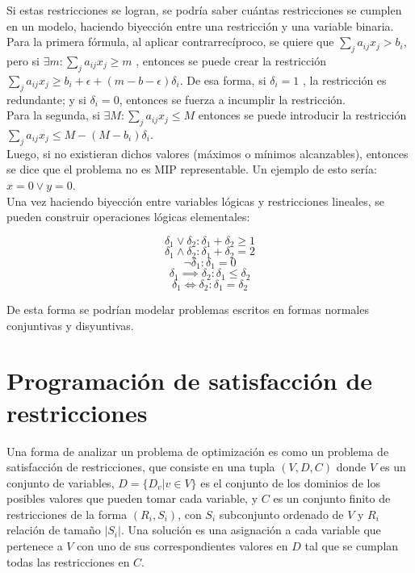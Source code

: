 \documentclass[12pt]{report}
\begin{document}
Si estas restricciones se logran, se podría saber cuántas restricciones se cumplen en un modelo, haciendo biyección entre una restricción y una variable binaria.\\

Para la primera fórmula, al aplicar contrarrecíproco, se quiere que $\sum_j a_{ij}x_j > b_i$, pero si $\exists m:\sum_j a_{ij}x_j\geq  m$ , entonces se puede crear la restricción $\sum_j a_{ij}x_j \geq  b_i+\epsilon+(m-b-\epsilon)\delta_i$. De esa forma, si $\delta_i=1$ , la restricción es redundante; y si $\delta_i=0$, entonces se fuerza a incumplir la restricción.\\

Para la segunda, si $\exists M:\sum_j a_{ij}x_j\leq  M$ entonces se puede introducir la restricción $\sum_j a_{ij}x_j \leq  M-(M-b_i)\delta_i$. \\

Luego, si no existieran dichos valores (máximos o mínimos alcanzables), entonces se dice que el problema no es MIP representable. Un ejemplo de esto sería: $x=0\lor  y=0$.\\

Una vez haciendo biyección entre variables lógicas y restricciones lineales, se pueden construir operaciones lógicas elementales:

$$\delta_1 \lor  \delta_2:\delta_1+\delta_2\geq 1$$
$$\delta_1 \land \delta_2:\delta_1+\delta_2=2$$
$$\neg\delta_1 :\delta_1=0$$
$$\delta_1 \implies  \delta_2:\delta_1\leq  \delta_2$$
$$\delta_1 \iff \delta_2:\delta_1=\delta_2$$

De esta forma se podrían modelar problemas escritos en formas normales conjuntivas y disyuntivas.

\section{Programación de satisfacción de restricciones}

Una forma de analizar un problema de optimización es como un problema de satisfacción de restricciones, que consiste en una tupla $(V,D,C)$ donde $V$ es un conjunto de variables, $D=\{D_v|v\in V\}$ es el conjunto de los dominios de los posibles valores que pueden tomar cada variable, y $C$ es un conjunto finito de restricciones de la forma $(R_i,S_i)$, con $S_i$ subconjunto ordenado de $V$ y $R_i$ relación de tamaño $|S_i|$. Una solución es una asignación a cada variable que pertenece a $V$ con uno de sus correspondientes valores en $D$ tal que se cumplan todas las restricciones en $C$.
\end{document}
